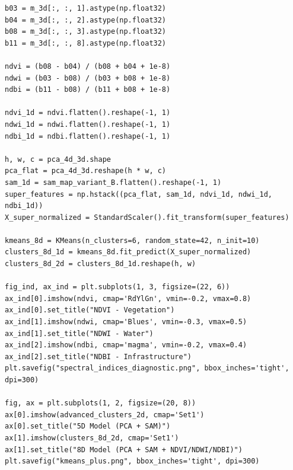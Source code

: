 \documentclass[12pt,a4paper]{article}
\begin{document}
\begin{lstlisting}[caption={Calculating NDVI, NDWI, NDBI and 8D segmentation.},label={lst:indices}]
b03 = m_3d[:, :, 1].astype(np.float32)
b04 = m_3d[:, :, 2].astype(np.float32)
b08 = m_3d[:, :, 3].astype(np.float32)
b11 = m_3d[:, :, 8].astype(np.float32)

ndvi = (b08 - b04) / (b08 + b04 + 1e-8)
ndwi = (b03 - b08) / (b03 + b08 + 1e-8)
ndbi = (b11 - b08) / (b11 + b08 + 1e-8)

ndvi_1d = ndvi.flatten().reshape(-1, 1)
ndwi_1d = ndwi.flatten().reshape(-1, 1)
ndbi_1d = ndbi.flatten().reshape(-1, 1)

h, w, c = pca_4d_3d.shape
pca_flat = pca_4d_3d.reshape(h * w, c)
sam_1d = sam_map_variant_B.flatten().reshape(-1, 1)
super_features = np.hstack((pca_flat, sam_1d, ndvi_1d, ndwi_1d, ndbi_1d))
X_super_normalized = StandardScaler().fit_transform(super_features)

kmeans_8d = KMeans(n_clusters=6, random_state=42, n_init=10)
clusters_8d_1d = kmeans_8d.fit_predict(X_super_normalized)
clusters_8d_2d = clusters_8d_1d.reshape(h, w)

fig_ind, ax_ind = plt.subplots(1, 3, figsize=(22, 6))
ax_ind[0].imshow(ndvi, cmap='RdYlGn', vmin=-0.2, vmax=0.8)
ax_ind[0].set_title("NDVI - Vegetation")
ax_ind[1].imshow(ndwi, cmap='Blues', vmin=-0.3, vmax=0.5)
ax_ind[1].set_title("NDWI - Water")
ax_ind[2].imshow(ndbi, cmap='magma', vmin=-0.2, vmax=0.4)
ax_ind[2].set_title("NDBI - Infrastructure")
plt.savefig("spectral_indices_diagnostic.png", bbox_inches='tight', dpi=300)

fig, ax = plt.subplots(1, 2, figsize=(20, 8))
ax[0].imshow(advanced_clusters_2d, cmap='Set1')
ax[0].set_title("5D Model (PCA + SAM)")
ax[1].imshow(clusters_8d_2d, cmap='Set1')
ax[1].set_title("8D Model (PCA + SAM + NDVI/NDWI/NDBI)")
plt.savefig("kmeans_plus.png", bbox_inches='tight', dpi=300)
\end{lstlisting}
\end{document}
